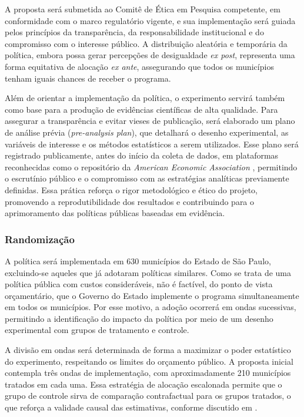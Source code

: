 A proposta será submetida ao Comitê de Ética em Pesquisa competente, em conformidade com o marco regulatório vigente, e sua implementação será guiada pelos princípios da transparência, da responsabilidade institucional e do compromisso com o interesse público. A distribuição aleatória e temporária da política, embora possa gerar percepções de desigualdade \textit{ex post}, representa uma forma equitativa de alocação \textit{ex ante}, assegurando que todos os municípios tenham iguais chances de receber o programa.

Além de orientar a implementação da política, o experimento servirá também como base para a produção de evidências científicas de alta qualidade. Para assegurar a transparência e evitar vieses de publicação, será elaborado um plano de análise prévia (\textit{pre-analysis plan}), que detalhará o desenho experimental, as variáveis de interesse e os métodos estatísticos a serem utilizados. Esse plano será registrado publicamente, antes do início da coleta de dados, em plataformas reconhecidas como o repositório da\textit{ American Economic Association} \cite{AEA_registry}, permitindo o escrutínio público e o compromisso com as estratégias analíticas previamente definidas. Essa prática reforça o rigor metodológico e ético do projeto, promovendo a reprodutibilidade dos resultados e contribuindo para o aprimoramento das políticas públicas baseadas em evidência.

\subsubsection{Randomização}

A política será implementada em 630 municípios do Estado de São Paulo, excluindo-se aqueles que já adotaram políticas similares. Como se trata de uma política pública com custos consideráveis, não é factível, do ponto de vista orçamentário, que o Governo do Estado implemente o programa simultaneamente em todos os municípios. Por esse motivo, a adoção ocorrerá em ondas sucessivas, permitindo a identificação do impacto da política por meio de um desenho experimental com grupos de tratamento e controle.

A divisão em ondas será determinada de forma a maximizar o poder estatístico do experimento, respeitando os limites do orçamento público. A proposta inicial contempla três ondas de implementação, com aproximadamente 210 municípios tratados em cada uma. Essa estratégia de alocação escalonada permite que o grupo de controle sirva de comparação contrafactual para os grupos tratados, o que reforça a validade causal das estimativas, conforme discutido em .

